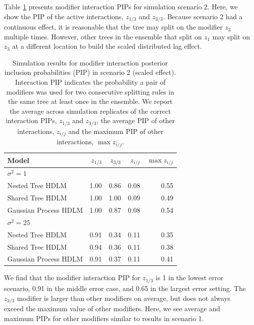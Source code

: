\documentclass[12pt]{article}
\begin{document}
Table \ref{tab:scen2_inc} presents modifier interaction PIPs for simulation scenario 2. Here, we show the PIP of the active interactions, $z_{1/3}$ and $z_{3/3}$. Because scenario 2 had a continuous effect, it is reasonable that the tree may split on the modifier $z_3$ multiple times. However, other trees in the ensemble that split on $z_1$ may split on $z_3$ at a different location to build the scaled distributed lag effect.
\begin{table}[!ht]
\footnotesize
    \centering
    \caption{Simulation results for modifier interaction posterior inclusion probabilities (PIP) in scenario 2 (scaled effect). Interaction PIP indicates the probability a pair of modifiers was used for two consecutive splitting rules in the same tree at least once in the ensemble. We report the average across simulation replicates of the correct interaction PIPs, $z_{1/3}$ and $z_{3/3}$, the average PIP of other interactions, $z_{i/j}$ and the maximum PIP of other interactions, $\max z_{i/j}$.}\vspace{6pt}
    \label{tab:scen2_inc}
    \begin{tabular}{lrrrr}
        \toprule[2pt]
        Model & $z_{1/3}$ & $z_{3/3}$ & $z_{i/j}$ & $\max z_{i/j}$\\
        \midrule
        \multicolumn{5}{l}{$\sigma^2=1$}\\
Nested Tree HDLM & 1.00 & 0.86 & 0.08 & 0.55\\
Shared Tree HDLM & 1.00 & 1.00 & 0.09 & 0.49\\
Gaussian Process HDLM & 1.00 & 0.87 & 0.08 & 0.54\\
        
       
        \midrule
        \multicolumn{5}{l}{$\sigma^2=25$}\\
Nested Tree HDLM & 0.91 & 0.34 & 0.11 & 0.35\\
Shared Tree HDLM & 0.94 & 0.36 & 0.11 & 0.38\\
Gaussian Process HDLM & 0.91 & 0.37 & 0.11 & 0.41\\

        \bottomrule[2pt]
    \end{tabular}
\end{table}

We find that the modifier interaction PIP for $z_{1/3}$ is 1 in the lowest error scenario, 0.91 in the middle error case, and 0.65 in the largest error setting. The $z_{3/3}$ modifier is larger than other modifiers on average, but does not always exceed the maximum value of other modifiers. Here, we see average and maximum PIPs for other modifiers similar to results in scenario 1.
\end{document}
